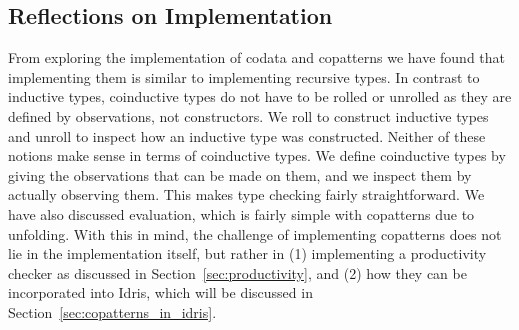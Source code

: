 \subsection{Reflections on Implementation}
From exploring the implementation of codata and copatterns we have found that implementing them is similar to implementing recursive types. In contrast to inductive types, coinductive types do not have to be rolled or unrolled as they are defined by observations, not constructors. We roll to construct inductive types and unroll to inspect how an inductive type was constructed. Neither of these notions make sense in terms of coinductive types. We define coinductive types by giving the observations that can be made on them, and we inspect them by actually observing them. This makes type checking fairly straightforward. We have also discussed evaluation, which is fairly simple with copatterns due to unfolding. With this in mind, the challenge of implementing copatterns does not lie in the implementation itself, but rather in (1) implementing a productivity checker as discussed in Section~\ref{sec:productivity}, and (2) how they can be incorporated into Idris, which will be discussed in Section~\ref{sec:copatterns_in_idris}.